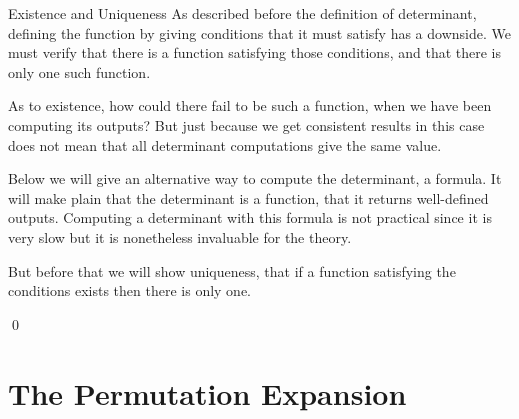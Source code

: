 \begin{frame}{Existence and Uniqueness}
As described before the definition of determinant,
defining the function by giving conditions that it must satisfy
has a downside.
We must verify that there is a 
function satisfying those conditions, and that there is only one such function.

As to existence,
how could there fail to be such a function, when we have been 
computing its outputs?
But just because we get consistent results in this case
does not mean that all determinant computations
give the same value.
\end{frame}
\begin{frame}
Below we will give an alternative way to compute
the determinant, a formula.
It will make plain that the determinant is a function, 
that it returns well-defined outputs.
Computing a determinant with this formula  
is not practical since it is very slow
but it is nonetheless invaluable for the theory.

\pause
But before that we will show uniqueness, 
that if a function satisfying the conditions
exists then there is only one.

\lm[lm:DetFcnIsUnique]

\pf 
{}
\qed
\end{frame}




\section{The Permutation Expansion}

